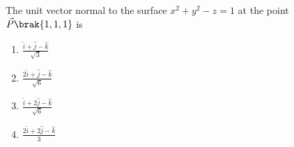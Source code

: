 \item The unit vector normal to the surface $x^2+y^2-z=1$ at the point $\vec{P}\brak{1,1,1}$ is 
\begin{enumerate}
    \item $\frac{\hat{i}+\hat{j}-\hat{k}}{\sqrt{3}}$
    \item $\frac{2\hat{i}+\hat{j}-\hat{k}}{\sqrt{6}}$
    \item $\frac{\hat{i}+2\hat{j}-\hat{k}}{\sqrt{6}}$
    \item $\frac{2\hat{i}+2\hat{j}-\hat{k}}{3}$
\end{enumerate}
 




